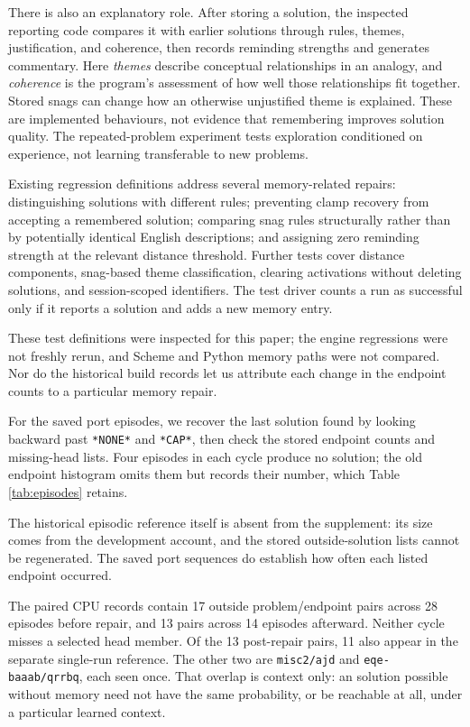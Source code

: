 \documentclass[10pt,letterpaper]{article}
\begin{document}
There is also an explanatory role. After storing a solution, the inspected reporting code
compares it with earlier solutions through rules, themes, justification, and coherence,
then records reminding strengths and generates commentary. Here \emph{themes} describe
conceptual relationships in an analogy, and \emph{coherence} is the program's assessment
of how well those relationships fit together. Stored snags can change how an otherwise
unjustified theme is explained. These are implemented behaviours, not evidence that
remembering improves solution quality. The repeated-problem experiment tests exploration
conditioned on experience, not learning transferable to new problems.

Existing regression definitions address several memory-related repairs: distinguishing
solutions with different rules; preventing clamp recovery from accepting a remembered
solution; comparing snag rules structurally rather than by potentially identical English
descriptions; and assigning zero reminding strength at the relevant distance threshold.
Further tests cover distance components, snag-based theme classification, clearing
activations without deleting solutions, and session-scoped identifiers. The test driver
counts a run as successful only if it reports a solution and adds a new memory entry.

These test definitions were inspected for this paper; the engine regressions were not
freshly rerun, and Scheme and Python memory paths were not compared. Nor do the historical
build records let us attribute each change in the endpoint counts to a particular memory
repair.

For the saved port episodes, we recover the last solution found by looking backward past
\texttt{*NONE*} and \texttt{*CAP*}, then check the stored endpoint counts and missing-head
lists. Four episodes in each cycle produce no solution; the old endpoint histogram omits
them but records their number, which Table \ref{tab:episodes} retains.

The historical episodic reference itself is absent from the supplement: its size comes
from the development account, and the stored outside-solution lists cannot be regenerated.
The saved port sequences do establish how often each listed endpoint occurred.



The paired CPU records contain 17 outside problem/endpoint pairs across 28 episodes before
repair, and 13 pairs across 14 episodes afterward. Neither cycle misses a selected head
member. Of the 13 post-repair pairs, 11 also appear in the separate single-run reference.
The other two are \texttt{misc2/ajd} and \texttt{eqe-baaab/qrrbq}, each seen once. That
overlap is context only: an solution possible without memory need not have the same
probability, or be reachable at all, under a particular learned context.
\end{document}
